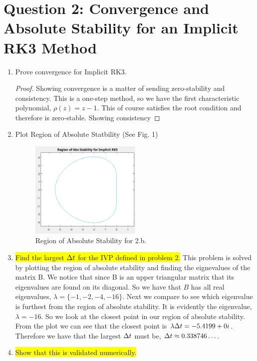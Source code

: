 \documentclass{article}
\begin{document}
\section*{Question 2: Convergence and Absolute Stability for an Implicit RK3
Method}

\begin{enumerate}[label=\alph*)]

    \item Prove convergence for Implicit RK3.
    \begin{proof}
        Showing convergence is a matter of sending zero-stability and
        consistency. This is a one-step method, so we have the first
        characteristic polynomial, $\rho(z) = z - 1$. This of course satisfies
        the root condition and therefore is zero-stable. Showing consistency 
    \end{proof}

    \item Plot Region of Absolute Statbility (See Fig. 1)
    \begin{figure}[ht]
        \centering 
        \includegraphics[width=0.5\textwidth]{2.b.AbsStab'.png}
        \caption{Region of Absolute Stability for 2.b.}
    \end{figure}

    \item \colorbox{yellow}{Find the largest $\Delta t$ for the IVP defined in problem 2.} 
    This problem is solved by plotting the region of absolute stability and
    finding the eignevalues of the matrix B. We notice that since B is an upper
    triangular matrix that its eigenvalues are found on its diagonal. So we have
    that $B$ has all real eigenvalues, $\lambda = \{-1, -2, -4, -16\}$. Next we
    compare to see which eigenvalue is furthest from the region of absolute
    stability. It is evidently the eigenvalue, $\lambda = -16$. So we look at
    the closest point in our region of absolute stability. From the plot we can
    see that the closest point is $\lambda\Delta t = -5.4199 + 0i$. Therefore we
    have that the largest $\Delta t$ must be, $\Delta t \approx 0.338746\ldots$. 

    \item \colorbox{yellow}{Show that this is validated numerically. }

\end{enumerate}
\end{document}
